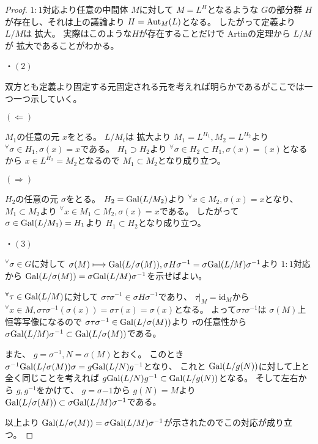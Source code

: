 \documentclass[../master_galois_theory]{subfiles}
\begin{document}
\begin{proof}
  $1:1$対応より任意の中間体 $M$に対して $M = L^H$となるような $G$の部分群 $H$が存在し、それは上の議論より $H = \mathrm{Aut}_M(L)$となる。
  したがって定義より $L/M$は \galois 拡大。
  実際はこのような$H$が存在することだけで Artinの定理から $L/M$が \galois 拡大であることがわかる。

  ・$(2)$

  双方とも定義より固定する元固定される元を考えれば明らかであるがここでは一つ一つ示していく。

  $(\Leftarrow)$

  $M_1$の任意の元 $x$をとる。
  $L/M_i$は \galois 拡大より $M_1 = L^{H_1} , M_2 = L^{H_2}$より ${}^\forall \sigma \in H_1 , \sigma (x) = x$である。
  $H_1 \supset H_2$より ${}^\forall \sigma \in H_2 \subset H_1 , \sigma (x) = (x)$となるから $x \in L^{H_2} = M_2$となるので $M_1 \subset M_2$となり成り立つ。

  $(\Rightarrow)$

  $H_2$の任意の元 $\sigma$をとる。
  $H_2 = \mathrm{Gal}(L/M_2)$より ${}^\forall x \in M_2 , \sigma (x) = x$となり、
  $M_1 \subset M_2$より ${}^\forall x \in M_1 \subset M_2 , \sigma (x) = x$である。
  したがって $\sigma \in \mathrm{Gal}(L/M_1) = H_1$より $H_1 \subset H_2$となり成り立つ。

  ・$(3)$

  ${}^\forall \sigma \in G$に対して $\sigma(M) \longmapsto \mathrm{Gal}(L/\sigma(M)) , \sigma H \sigma^{-1} = \sigma \mathrm{Gal}(L/M) \sigma^{-1}$より $1:1$対応から $\mathrm{Gal}(L/\sigma(M)) = \sigma \mathrm{Gal}(L/M) \sigma^{-1}$を示せばよい。

  ${}^\forall \tau \in \mathrm{Gal}(L/M)$に対して $\sigma \tau \sigma^{-1} \in \sigma H \sigma^{-1}$であり、 $\tau|_M = \mathrm{id}_M$から
  ${}^\forall x \in M , \sigma \tau \sigma^{-1} (\sigma(x)) = \sigma \tau (x) = \sigma (x)$となる。
  よって$\sigma \tau \sigma^{-1}$は $\sigma(M)$上恒等写像になるので $\sigma \tau \sigma^{-1} \in \mathrm{Gal}(L/\sigma(M))$より $\tau$の任意性から
  $\sigma \mathrm{Gal}(L/M) \sigma^{-1} \subset \mathrm{Gal}(L/\sigma(M))$である。

  また、 $g = \sigma^{-1} , N = \sigma(M)$とおく。
  このとき $\sigma^{-1} \mathrm{Gal}(L/\sigma(M)) \sigma = g \mathrm{Gal}(L/N) g^{-1}$となり、
  これと $\mathrm{Gal}(L/g(N))$に対して上と全く同じことを考えれば
  $g \mathrm{Gal}(L/N) g^{-1} \subset \mathrm{Gal}(L/g(N))$となる。
  そして左右から $g , g^{-1}$をかけて、 $g = \sigma{-1}$から $g(N) = M$より
  $\mathrm{Gal}(L/\sigma(M)) \subset \sigma \mathrm{Gal}(L/M) \sigma^{-1}$である。

  以上より $\mathrm{Gal}(L/\sigma(M)) = \sigma \mathrm{Gal}(L/M) \sigma^{-1}$が示されたのでこの対応が成り立つ。


\end{proof}
\end{document}
